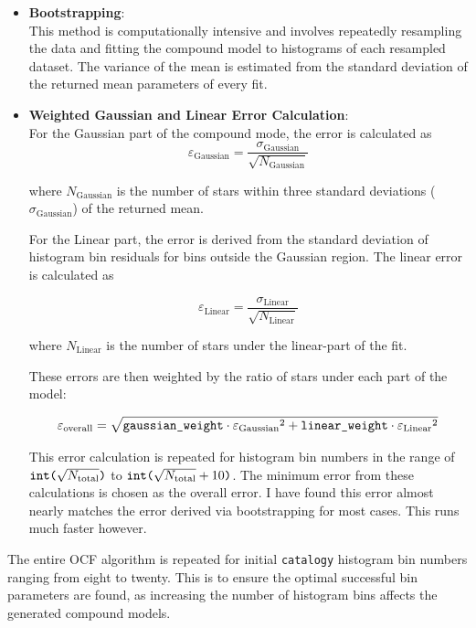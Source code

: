 \documentclass[svgnames]{article}     %
\begin{document}
\begin{itemize}
  \item[1.] \textbf{Bootstrapping}: \\
  This method is computationally intensive and involves repeatedly resampling
  the data and fitting the compound model to histograms of each resampled
  dataset. The variance of the mean is estimated from the standard deviation of
  the returned mean parameters of every fit. 
\item[2.] \textbf{Weighted Gaussian and Linear Error Calculation}: \\
  For the Gaussian part of the compound mode, the error is calculated as 
  \[
    \varepsilon_\text{Gaussian} = \frac{\sigma_\text{Gaussian}}{\sqrt{N_\text{Gaussian} }}
  \] \vspace{3px}
  
  where $N_\text{Gaussian} $ is the number of stars within three standard deviations
  ($\sigma_\text{Gaussian} $) of the
  returned mean. 

  For the Linear part, the error is derived from the standard deviation of histogram bin residuals
  for bins outside the Gaussian region. The linear error is calculated as 

   \[
     \varepsilon_\text{Linear}
     = \frac{\sigma_\text{Linear}}{\sqrt{N_\text{Linear}}}
  \] \vspace{3px}
  
  where $N_\text{Linear} $ is the number of stars under the linear-part of the
  fit. 

  These errors are then weighted by the ratio of stars under each part of the
  model: 

  \[
  \varepsilon_\text{overall} = \sqrt{\verb|gaussian_weight| \cdot
  {\varepsilon_\text{Gaussian}}^2 + \verb|linear_weight| \cdot
{\varepsilon_\text{Linear}}^2}
  \] \vspace{3px}
  
  This error calculation is repeated for histogram bin numbers in the range of
  $\verb|int(|\sqrt{N_\text{total}}\verb|)|$ to
  $\verb|int(|\sqrt{N_\text{total}} + 10\verb|)|$. The minimum error from these
  calculations is chosen as the overall error. I have found this error almost
  nearly matches the error derived via bootstrapping for most cases. This runs
  much faster however. 
\end{itemize}

The entire OCF algorithm is repeated for initial \verb|catalogy| histogram bin
numbers ranging from eight to twenty. This is to ensure the optimal successful
bin parameters are found, as increasing the number of histogram bins affects
the generated compound models.
\end{document}
